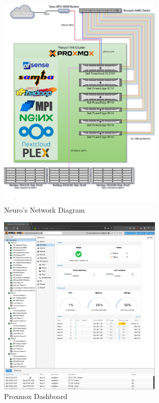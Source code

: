 \documentclass[10pt,journal,compsoc]{IEEEtran}
\begin{document}
\begin{figure}[htp]
\centering
\includegraphics[width=7.9cm]{Images/Neuro_Network_Diagram_Small.png}
\caption{Neuro's Network Diagram}
\label{fig:Network Diagram}
\end{figure}

\begin{figure}[htp]
\centering
\includegraphics[width=7.9cm]{Images/proxmoxDashboard.png}
\caption{Proxmox Dashboard}
\label{fig:Network Diagram}
\end{figure}
\end{document}
